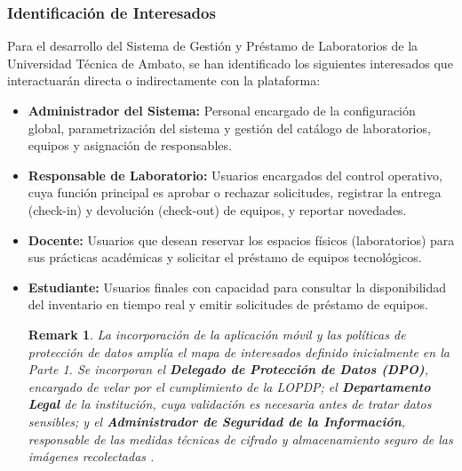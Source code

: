 \documentclass[pdflatex,sn-mathphys-num]{sn-jnl}%
\theoremstyle{thmstyleone}%
\theoremstyle{thmstyletwo}%
\newtheorem{remark}{Remark}%
\theoremstyle{thmstylethree}%
\begin{document}
 \subsubsection{Identificación de Interesados}
Para el desarrollo del Sistema de Gestión y Préstamo de Laboratorios de la Universidad Técnica de Ambato, se han identificado los siguientes interesados que interactuarán directa o indirectamente con la plataforma:
 \begin{itemize}
 	\item \textbf{Administrador del Sistema:} Personal encargado de la configuración global, parametrización del sistema y gestión del catálogo de laboratorios, equipos y asignación de responsables.
 	\item \textbf{Responsable de Laboratorio:} Usuarios encargados del control operativo, cuya función principal es aprobar o rechazar solicitudes, registrar la entrega (check-in) y devolución (check-out) de equipos, y reportar novedades.
 	\item \textbf{Docente:} Usuarios que desean reservar los espacios físicos (laboratorios) para sus prácticas académicas y solicitar el préstamo de equipos tecnológicos.
 	\item \textbf{Estudiante:} Usuarios finales con capacidad para consultar la disponibilidad del inventario en tiempo real y emitir solicitudes de préstamo de equipos.
 	\begin{remark}
 		La incorporación de la aplicación móvil y las políticas de protección de datos amplía el mapa de interesados definido inicialmente en la Parte 1. Se incorporan el \textbf{Delegado de Protección de Datos (DPO)}, encargado de velar por el cumplimiento de la LOPDP; el \textbf{Departamento Legal} de la institución, cuya validación es necesaria antes de tratar datos sensibles; y el \textbf{Administrador de Seguridad de la Información}, responsable de las medidas técnicas de cifrado y almacenamiento seguro de las imágenes recolectadas \cite{piray-rodriguez_alisis_2025}.
 	\end{remark}
 \end{itemize}
\end{document}
